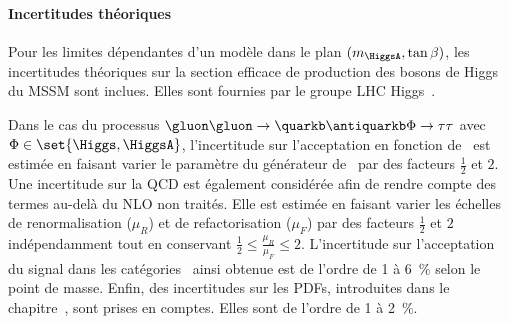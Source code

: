 \paragraph{Incertitudes théoriques}
Pour les limites dépendantes d'un modèle dans le plan $(m_{\HiggsA},\tan\beta)$,
les incertitudes théoriques sur la section efficace de production des bosons de Higgs du MSSM sont inclues.
Elles sont fournies par le groupe LHC Higgs~\cite{MSSMneutralHiggsTwiki}.
\par
Dans le cas du processus $\gluon\gluon\to\quarkb\antiquarkb\Phi\to\tau\tau$ avec $\Phi\in\set{\Higgs,\HiggsA}$, l'incertitude sur l'acceptation en fonction de \Nbjets\ est estimée en faisant varier le paramètre  du générateur de \POWHEG\ par des facteurs $\frac{1}{2}$ et $2$.
Une incertitude sur la QCD est également considérée afin de rendre compte des termes au-delà du NLO non traités.
Elle est estimée en faisant varier les échelles de renormalisation ($\mu_R$) et de refactorisation ($\mu_F$) par des facteurs $\frac{1}{2}$ et $2$ indépendamment tout en conservant $\frac{1}{2}\leq\frac{\mu_R}{\mu_F}\leq2$.
L'incertitude sur l'acceptation du signal dans les catégories \CATbtag\ ainsi obtenue est de l'ordre de \num{1} à \SI{6}{\%} selon le point de masse.
Enfin, des incertitudes sur les PDFs, introduites dans le chapitre~, sont prises en comptes.
Elles sont de l'ordre de \num{1} à \SI{2}{\%}.